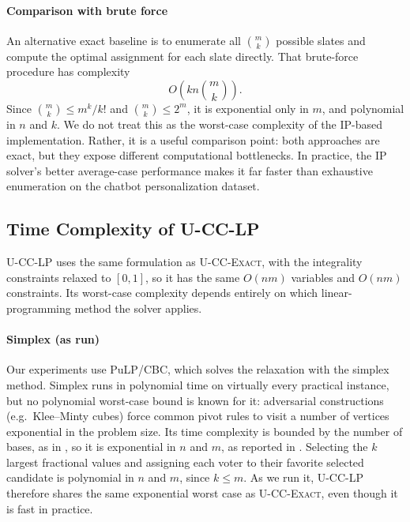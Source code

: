 \documentclass[letterpaper]{article} %
\newcommand{\Exact}{\textsc{U-CC-Exact}}
\newcommand{\LP}{\textsc{U-CC-LP}}
\begin{document}
\paragraph{Comparison with brute force} An alternative exact baseline is to enumerate all \(\binom{m}{k}\) possible slates and compute the optimal assignment for each slate directly.
That brute-force procedure has complexity
\[
O\!\left(k n \binom{m}{k}\right).
\]
Since \(\binom{m}{k}\le m^k/k!\) and \(\binom{m}{k}\le 2^m\), it is exponential only in \(m\), and polynomial in \(n\) and \(k\).
We do not treat this as the worst-case complexity of the IP-based implementation.
Rather, it is a useful comparison point: both approaches are exact, but they expose different computational bottlenecks.
In practice, the IP solver's better average-case performance makes it far faster than exhaustive enumeration on the chatbot personalization dataset.

\subsection{Time Complexity of \LP{}}
\label{app:lp-complexity}
\LP{} uses the same formulation as \Exact{}, with the integrality constraints relaxed to $[0,1]$, so it has the same $O(nm)$ variables and $O(nm)$ constraints.
Its worst-case complexity depends entirely on which linear-programming method the solver applies.

\paragraph{Simplex (as run)} Our experiments use PuLP/CBC, which solves the relaxation with the simplex method.
Simplex runs in polynomial time on virtually every practical instance, but no polynomial worst-case bound is known for it: adversarial constructions (e.g.\ Klee--Minty cubes) force common pivot rules to visit a number of vertices exponential in the problem size.
Its time complexity is bounded by the number of bases, as in , so it is exponential in \(n\) and \(m\), as reported in .
Selecting the \(k\) largest fractional values and assigning each voter to their favorite selected candidate is polynomial in \(n\) and \(m\), since \(k\le m\).
As we run it, \LP{} therefore shares the same exponential worst case as \Exact{}, even though it is fast in practice.
\end{document}
